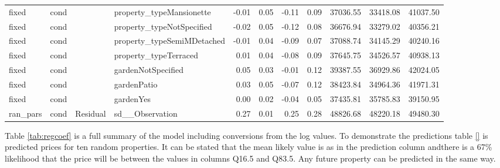 \documentclass{scrartcl}
\begin{document}
\begin{landscape}
\begin{table}[htbp]
\begin{adjustbox}{max width=\linewidth}
\begin{tabular}{llllrrrrrrr}
			fixed & cond &  & property\_typeMansionette & -0.01 & 0.05 & -0.11 & 0.09 & 37036.55 & 33418.08 & 41037.50 \\ 
			fixed & cond &  & property\_typeNotSpecified & -0.02 & 0.05 & -0.12 & 0.08 & 36676.94 & 33279.02 & 40356.21 \\ 
			fixed & cond &  & property\_typeSemiMDetached & -0.01 & 0.04 & -0.09 & 0.07 & 37088.74 & 34145.29 & 40240.16 \\ 
			fixed & cond &  & property\_typeTerraced & 0.01 & 0.04 & -0.08 & 0.09 & 37645.75 & 34526.57 & 40938.13 \\ 
			fixed & cond &  & gardenNotSpecified & 0.05 & 0.03 & -0.01 & 0.12 & 39387.55 & 36929.86 & 42024.05 \\ 
			fixed & cond &  & gardenPatio & 0.03 & 0.05 & -0.07 & 0.12 & 38423.84 & 34964.36 & 41971.31 \\ 
			fixed & cond &  & gardenYes & 0.00 & 0.02 & -0.04 & 0.05 & 37435.81 & 35785.83 & 39150.95 \\ 
			ran\_pars & cond & Residual & sd\_\_Observation & 0.27 & 0.01 & 0.25 & 0.28 & 48826.68 & 48220.18 & 49480.30 \\ 
			\hline
		\end{tabular}
	\end{adjustbox}
	\end{table}
\end{landscape}


Table \ref*{tab:regcoef} is a full summary of the model including conversions from the log values. To demonstrate the predictions table \ref{} is predicted prices for ten random properties. It can be stated that the mean likely value is as in the prediction column andthere is a 67\% likelihood that the price will be between the values in columns Q16.5 and Q83.5. Any future property can be predicted in the same way.
\end{document}
